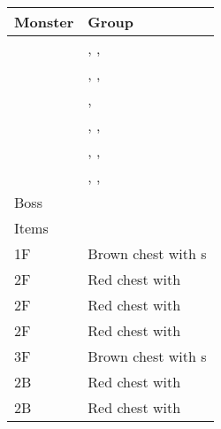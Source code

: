 \noindent\begin{tabularx}{\textwidth}[l]{lX}
	Monster & Group
\\ \hline
	\nameref{monster:minotaur_zombie}
	& \nameref{monster:minotaur_zombie}, \nameref{monster:shadow}, \nameref{monster:iflyte} \\
	& \nameref{monster:minotaur_zombie}, \nameref{monster:shadow}, \nameref{monster:chimera}
\\ \hline
	\nameref{monster:shadow}
	& \nameref{monster:shadow}, \nameref{monster:shadow} \\
	& \nameref{monster:shadow}, \nameref{monster:shadow}, \nameref{monster:shadow}
\\ \hline
	\nameref{monster:gorgon}
	& \nameref{monster:gorgon}, \nameref{monster:shadow}, \nameref{monster:phanquid} \\
	& \nameref{monster:gorgon}, \nameref{monster:shadow}, \nameref{monster:stheno}
\\ \hline
	Boss & \nameref{monster:skullrus_rex}
\\ \hline
	Items \\
	1F & Brown chest with \nameref{weapon:bomb}s \\
	2F & Red chest with \nameref{spell:fire} \\
	2F & Red chest with \nameref{armor:venus_shield} \\
	2F & Red chest with \nameref{spell:blizzard} \\
	3F & Brown chest with \nameref{item:cure_potion}s \\
	2B & Red chest with \nameref{spell:aero} \\
	2B & Red chest with \nameref{armor:aegis_shield}
\end{tabularx}
